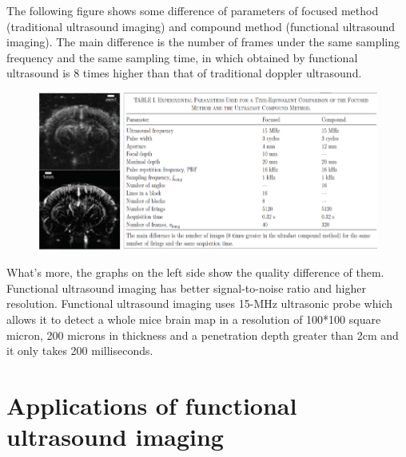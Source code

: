 \documentclass[paper=a4, fontsize=11pt]{scrartcl} %
\numberwithin{equation}{section} %
\numberwithin{figure}{section} %
\numberwithin{table}{section} %
\begin{document}
The following figure shows some difference of parameters of focused method (traditional ultrasound imaging) and compound method (functional ultrasound imaging). The main difference is the number of frames under the same sampling frequency and the same sampling time, in which obtained by functional ultrasound is 8 times higher than that of traditional doppler ultrasound.
\begin{figure}[htbp]
	\centering
	\includegraphics[width=1\linewidth]{im4}
\end{figure}

What’s more, the graphs on the left side show the quality difference of them. Functional ultrasound imaging has better signal-to-noise ratio and higher resolution. Functional ultrasound imaging uses 15-MHz ultrasonic probe which allows it to detect a whole mice brain map in a resolution of 100*100 square micron, 200 microns in thickness and a penetration depth greater than 2cm and it only takes 200 milliseconds. 
\section{Applications of functional ultrasound imaging}
\end{document}
